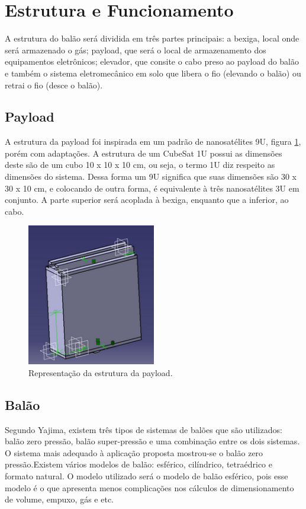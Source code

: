 \section{Estrutura e Funcionamento}
  A estrutura do balão será dividida em três partes principais: a bexiga, local onde será armazenado o gás; payload, que será o local de armazenamento dos equipamentos eletrônicos; elevador, que consite o cabo preso ao payload do balão e também o sistema eletromecânico em solo que libera o fio (elevando o balão) ou retrai o fio (desce o balão).

  \subsection{Payload}
    A estrutura da payload foi inspirada em um padrão de nanosatélites 9U, figura \ref{img:payload}, porém com adaptações. A estrutura de um CubeSat 1U possui as dimensões deste são de um cubo 10 x 10 x 10 cm, ou seja, o termo 1U diz respeito as dimensões do sistema. Dessa forma um 9U significa que suas dimensões são 30 x 30 x 10 cm, e colocando de outra forma, é equivalente à três nanosatélites 3U em conjunto. A parte superior será acoplada à bexiga, enquanto que a inferior, ao cabo.

    \begin{figure}[H]
      \centering
      \includegraphics[width=0.5\textwidth]{figuras/payload}
      \caption{Representação da estrutura da payload. }
      \label{img:payload}
    \end{figure}

  \subsection{Balão}
    Segundo Yajima, existem três tipos de sistemas de balões que são utilizados: balão zero pressão, balão super-pressão e uma combinação entre os dois sistemas. O sistema mais adequado à aplicação proposta mostrou-se o balão zero pressão.Existem vários modelos de balão: esférico, cilíndrico, tetraédrico e formato natural. O modelo utilizado será o modelo de balão esférico, pois esse modelo é o que apresenta menos complicações nos cálculos de dimensionamento de volume, empuxo, gás e etc.

